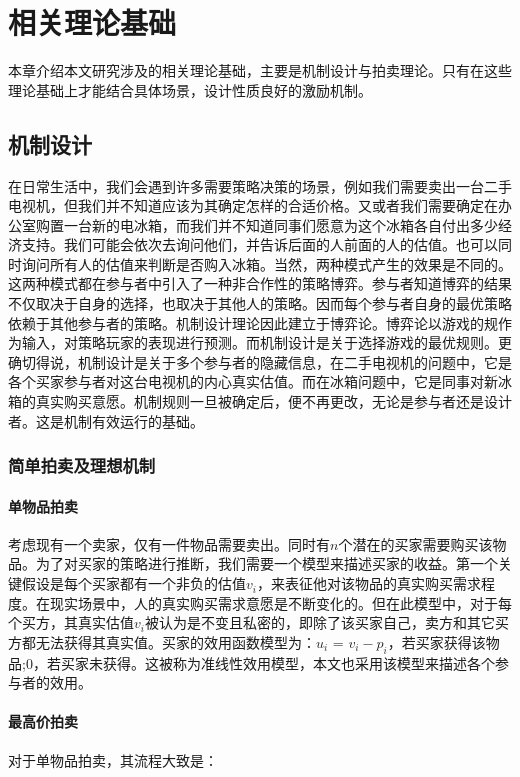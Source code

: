 \documentclass[promaster]{thesis-uestc}
\begin{document}
\chapter{相关理论基础}

本章介绍本文研究涉及的相关理论基础，主要是机制设计与拍卖理论。只有在这些理论基础上才能结合具体场景，设计性质良好的激励机制。

\section{机制设计}

在日常生活中，我们会遇到许多需要策略决策的场景，例如我们需要卖出一台二手电视机，但我们并不知道应该为其确定怎样的合适价格。又或者我们需要确定在办公室购置一台新的电冰箱，而我们并不知道同事们愿意为这个冰箱各自付出多少经济支持。我们可能会依次去询问他们，并告诉后面的人前面的人的估值。也可以同时询问所有人的估值来判断是否购入冰箱。当然，两种模式产生的效果是不同的。这两种模式都在参与者中引入了一种非合作性的策略博弈。参与者知道博弈的结果不仅取决于自身的选择，也取决于其他人的策略。因而每个参与者自身的最优策略依赖于其他参与者的策略。机制设计理论因此建立于博弈论。博弈论以游戏的规作为输入，对策略玩家的表现进行预测。而机制设计是关于选择游戏的最优规则。更确切得说，机制设计是关于多个参与者的隐藏信息，在二手电视机的问题中，它是各个买家参与者对这台电视机的内心真实估值。而在冰箱问题中，它是同事对新冰箱的真实购买意愿。机制规则一旦被确定后，便不再更改，无论是参与者还是设计者。这是机制有效运行的基础。

\subsection{简单拍卖及理想机制}

\subsubsection{单物品拍卖}
考虑现有一个卖家，仅有一件物品需要卖出。同时有$n$个潜在的买家需要购买该物品。为了对买家的策略进行推断，我们需要一个模型来描述买家的收益。第一个关键假设是每个买家都有一个非负的估值$v_i$，来表征他对该物品的真实购买需求程度。在现实场景中，人的真实购买需求意愿是不断变化的。但在此模型中，对于每个买方，其真实估值$v_i$被认为是不变且私密的，即除了该买家自己，卖方和其它买方都无法获得其真实值。买家的效用函数模型为：$u_i$ = $v_i-p_i$，若买家获得该物品;$0$，若买家未获得。这被称为准线性效用模型，本文也采用该模型来描述各个参与者的效用。

\subsubsection{最高价拍卖}
对于单物品拍卖，其流程大致是：
\end{document}
